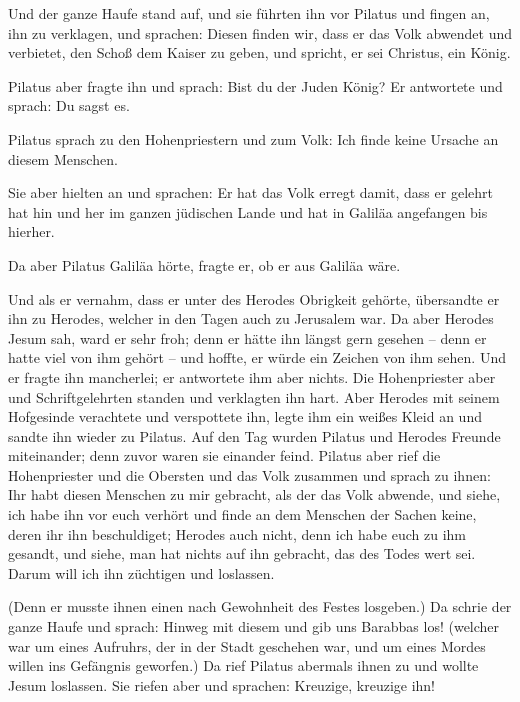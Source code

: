  Und der ganze Haufe stand auf, und sie führten ihn vor
Pilatus  und fingen an, ihn zu verklagen, und sprachen:
Diesen finden wir, dass er das Volk abwendet und verbietet, den Schoß
dem Kaiser zu geben, und spricht, er sei Christus, ein König.

 Pilatus aber fragte ihn und sprach: Bist du der Juden
König? Er antwortete und sprach: Du sagst es.

 Pilatus sprach zu den Hohenpriestern und zum Volk: Ich
finde keine Ursache an diesem Menschen.

 Sie aber hielten an und sprachen: Er hat das Volk erregt
damit, dass er gelehrt hat hin und her im ganzen jüdischen Lande und hat
in Galiläa angefangen bis hierher.

 Da aber Pilatus Galiläa hörte, fragte er, ob er aus
Galiläa wäre.

 Und als er vernahm, dass er unter des Herodes Obrigkeit
gehörte, übersandte er ihn zu Herodes, welcher in den Tagen auch zu
Jerusalem war.  Da aber Herodes Jesum sah, ward er sehr
froh; denn er hätte ihn längst gern gesehen -- denn er hatte viel von
ihm gehört -- und hoffte, er würde ein Zeichen von ihm sehen.
 Und er fragte ihn mancherlei; er antwortete ihm aber
nichts.  Die Hohenpriester aber und Schriftgelehrten
standen und verklagten ihn hart.  Aber Herodes mit seinem
Hofgesinde verachtete und verspottete ihn, legte ihm ein weißes Kleid an
und sandte ihn wieder zu Pilatus.  Auf den Tag wurden
Pilatus und Herodes Freunde miteinander; denn zuvor waren sie einander
feind.  Pilatus aber rief die Hohenpriester und die
Obersten und das Volk zusammen  und sprach zu ihnen: Ihr
habt diesen Menschen zu mir gebracht, als der das Volk abwende, und
siehe, ich habe ihn vor euch verhört und finde an dem Menschen der
Sachen keine, deren ihr ihn beschuldiget;  Herodes auch
nicht, denn ich habe euch zu ihm gesandt, und siehe, man hat nichts auf
ihn gebracht, das des Todes wert sei.  Darum will ich ihn
züchtigen und loslassen.

 (Denn er musste ihnen einen nach Gewohnheit des Festes
losgeben.)  Da schrie der ganze Haufe und sprach: Hinweg
mit diesem und gib uns Barabbas los!  (welcher war um
eines Aufruhrs, der in der Stadt geschehen war, und um eines Mordes
willen ins Gefängnis geworfen.)  Da rief Pilatus abermals
ihnen zu und wollte Jesum loslassen.  Sie riefen aber und
sprachen: Kreuzige, kreuzige ihn!

